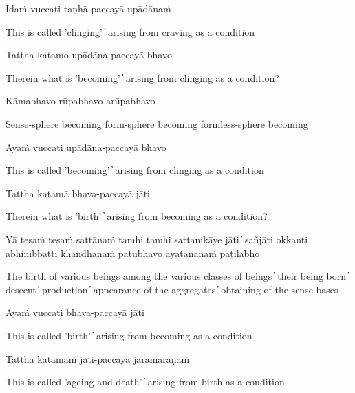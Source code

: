 Idaṁ vuccati taṇhā-paccayā upādānaṁ

\begin{cprenglish}
This is called 'clinging'  ̓  arising from craving as a condition
\end{cprenglish}

Tattha katamo upādāna-paccayā bhavo

\begin{cprenglish}
Therein what is 'becoming'  ̓  arising from clinging as a condition?
\end{cprenglish}

Kāmabhavo rūpabhavo arūpabhavo

\begin{cprenglish}
Sense-sphere becoming form-sphere becoming formless-sphere becoming
\end{cprenglish}

Ayaṁ vuccati upādāna-paccayā bhavo

\begin{cprenglish}
This is called 'becoming'  ̓  arising from clinging as a condition
\end{cprenglish}

Tattha katamā bhava-paccayā jāti

\begin{cprenglish}
Therein what is 'birth'  ̓  arising from becoming as a condition?
\end{cprenglish}

Yā tesaṁ tesaṁ sattānaṁ tamhi tamhi sattanikāye jāti  ̓  sañjāti okkanti abhinibbatti khandhānaṁ pātubhāvo āyatanānaṁ paṭilābho

\begin{cprenglish}
The birth of various beings among the various classes of beings  ̓  their being born  ̓  descent  ̓  production  ̓  appearance of the aggregates  ̓  obtaining of the sense-bases
\end{cprenglish}

Ayaṁ vuccati bhava-paccayā jāti

\begin{cprenglish}
This is called 'birth'  ̓  arising from becoming as a condition
\end{cprenglish}

Tattha katamaṁ jāti-paccayā jarāmaraṇaṁ

\begin{cprenglish}
This is called 'ageing-and-death'  ̓  arising from birth as a condition
\end{cprenglish}

